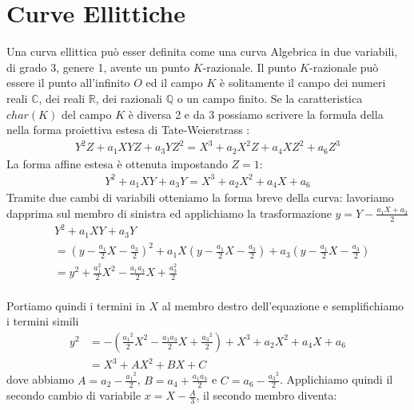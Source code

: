 \documentclass[a4paper,12pt]{tesiinfo}
\newcommand\ddfrac[2]{\frac{\displaystyle #1}{\displaystyle #2}}
\begin{document}
\chapter{Curve Ellittiche}
Una curva ellittica pu\`o esser definita come una curva Algebrica in due variabili, di grado 3, genere 1, avente un punto $K$-razionale. Il punto $K$-razionale pu\`o essere il punto all'infinito $O$ ed il campo $K$ \`e solitamente il campo dei numeri reali $\mathbb{C}$, dei reali $\mathbb{R}$, dei razionali $\mathbb{Q}$ o un campo finito. Se la caratteristica $char(K)$ del campo $K$ \`e diversa 2 e da 3 possiamo scrivere la formula della nella forma proiettiva estesa di Tate-Weierstrass :
\begin{gather}
Y^{2}Z + a_1XYZ + a_3YZ^2 =X^3 + a_2X^2Z + a_4XZ^2 + a_6Z^3
\end{gather}
La forma affine estesa \`e ottenuta impostando $Z=1$: 
\begin{gather}
Y^{2} + a_1XY + a_3Y =X^3 + a_2X^2 + a_4X + a_6
\end{gather}
Tramite due cambi di variabili otteniamo la forma breve della curva: lavoriamo dapprima sul membro di sinistra ed applichiamo la trasformazione $y = Y - \ddfrac{a_1X + a_3}{2}$
\begin{align*}
&Y^{2} + a_1XY + a_3Y  
\\ 
&= \left ( y - \ddfrac{a_1}{2}X - \ddfrac{a_3}{2} \right )^2 + a_1X \left ( y - \ddfrac{a_1}{2}X - \ddfrac{a_3}{2} \right ) + a_3 \left ( y - \ddfrac{a_1}{2}X - \ddfrac{a_3}{2} \right ) 
\\
&= y^2 + \ddfrac{a_1^2}{2}X^2 - \ddfrac{a_1a_3}{2}X +\ddfrac{a_3^2}{2} 
\end{align*}
\\
Portiamo quindi i termini in $X$ al membro destro dell'equazione e semplifichiamo i termini simili
\begin{align*}
y^2 &= - \left ( \ddfrac{{a_1}^2}{2}X^2 - \ddfrac{a_1a_3}{2}X +\ddfrac{{a_3}^2}{2} \right ) + X^3 + a_2X^2 + a_4X + a_6
\\
&= X^3 + AX^2 + BX + C 
\end{align*}
dove abbiamo $A = a_2 - \ddfrac{{a_1}^2}{2}$, $B = a_4 + \ddfrac{a_1a_3}{2}$ e $C = a_6 - \ddfrac{{a_3}^2}{2}$.
Applichiamo quindi il secondo cambio di variabile $x = X - \ddfrac{A}{3}$, il secondo membro diventa:
\end{document}
